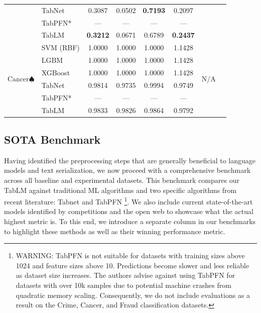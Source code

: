 \documentclass{article}
\newcommand{\xmark}{\ding{55}}%
\theoremstyle{plain}
\theoremstyle{definition}
\theoremstyle{remark}
\begin{document}
\begin{table}[h!]
\begin{center}
\begin{small}
\begin{sc}
\begin{adjustbox}{width=\textwidth}
\begin{tabular}{p{2cm}p{2.8cm}|cccc|c|c}
& TabNet&0.3087&0.0502&\textbf{0.7193}&0.2097&\\
& TabPFN*&---&---&---&---&\\ 
& TabLM &\textbf{0.3212}&0.0671&0.6789&\textbf{0.2437}&\\ 
\hline
\multirow{6}{*}{Cancer$\spadesuit$} & SVM (RBF)&1.0000&1.0000&1.0000&1.1428&\multirow{6}{*}{N/A}&\multirow{6}{*}{\xmark}\\ 
& LGBM&1.0000&1.0000&1.0000&1.1428&\\ 
& XGBoost&1.0000&1.0000&1.0000&1.1428&\\ 
& TabNet&0.9814&0.9735&0.9994&0.9749&\\
& TabPFN*&---&---&---&---&\\ 
& TabLM &0.9833&0.9826&0.9864&0.9792&\\ 

\bottomrule
\end{tabular}
\end{adjustbox}
\end{sc}
\end{small}
\end{center}
\vskip -0.1in
\end{table}

\subsection{SOTA Benchmark}

Having identified the preprocessing steps that are generally beneficial to language models and text serialization, we now proceed with a comprehensive benchmark across all baseline and experimental datasets. This benchmark compares our TabLM against traditional ML algorithms and two specific algorithms from recent literature: Tabnet \cite{arik2021tabnet} and TabPFN \footnote{\label{fn:sample}WARNING: TabPFN is not suitable for datasets with training sizes above 1024 and feature sizes above 10. Predictions become slower and less reliable as dataset size increases. The authors advise against using TabPFN for datasets with over 10k samples due to potential machine crashes from quadratic memory scaling. Consequently, we do not include evaluations as a result on the Crime, Cancer, and Fraud classification datasets.}\cite{hollmann2022tabpfn}. We also include current state-of-the-art models identified by competitions and the open web to showcase what the actual highest metric is. To this end, we introduce a separate column in our benchmarks to highlight these methods as well as their winning performance metric.
\end{document}
